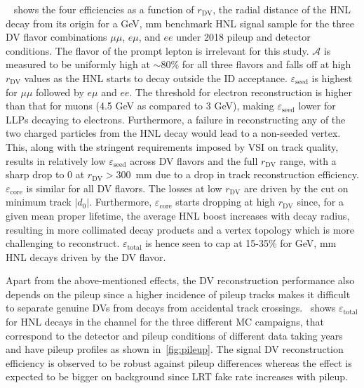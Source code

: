 ~ shows the four efficiencies as a function of $r_\text{DV}$, the radial distance of the HNL decay from its origin for a  GeV,  mm benchmark HNL signal sample for the three DV flavor combinations $\mu\mu$, $e\mu$, and $ee$ under 2018 pileup and detector conditions. The flavor of the prompt lepton is irrelevant for this study. $\mathcal{A}$ is measured to be uniformly high at $\sim$80\% for all three flavors and falls off at high $r_\text{DV}$ values as the HNL starts to decay outside the ID acceptance. $\varepsilon_\mathrm{seed}$ is highest for $\mu\mu$ followed by $e\mu$ and $ee$. The \pT threshold for electron reconstruction is higher than that for muons (4.5 GeV as compared to 3 GeV), making $\varepsilon_\mathrm{seed}$ lower for LLPs decaying to electrons. Furthermore, a failure in reconstructing any of the two charged particles from the HNL decay would lead to a non-seeded vertex. This, along with the stringent requirements imposed by VSI on track quality, results in relatively low $\varepsilon_\mathrm{seed}$ across DV flavors and the full $r_\text{DV}$ range, with a sharp drop to 0 at $r_\text{DV}>300$~mm due to a drop in track reconstruction efficiency. $\varepsilon_\mathrm{core}$ is similar for all DV flavors. The losses at low $r_\text{DV}$ are driven by the cut on minimum track $|d_0|$. Furthermore, $\varepsilon_\mathrm{core}$ starts dropping at high $r_\text{DV}$ since, for a given mean proper lifetime, the average HNL boost increases with decay radius, resulting in more collimated decay products and a vertex topology which is more challenging to reconstruct. $\varepsilon_\mathrm{total}$ is hence seen to cap at 15-35\% for  GeV,  mm HNL decays driven by the DV flavor.

Apart from the above-mentioned effects, the DV reconstruction performance also depends on the pileup since a higher incidence of pileup tracks makes it difficult to separate genuine DVs from decays from accidental track crossings.~ shows $\varepsilon_\mathrm{total}$ for HNL decays in the \uuu channel for the three different MC campaigns, that correspond to the detector and pileup conditions of different data taking years and have pileup profiles as shown in~\cref{fig:pileup}. The signal DV reconstruction efficiency is observed to be robust against pileup differences whereas the effect is expected to be bigger on background since LRT fake rate increases with pileup.

